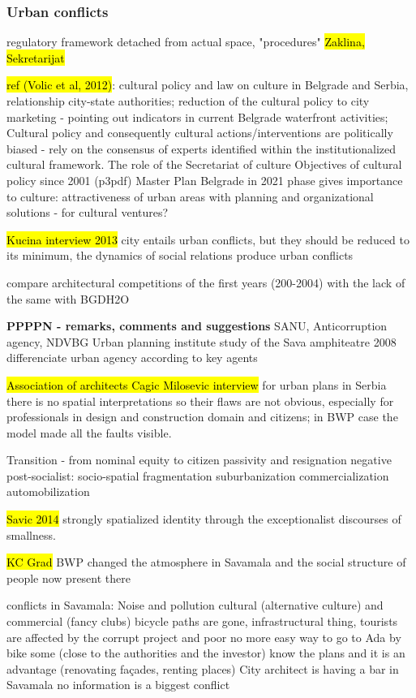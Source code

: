 \documentclass[11pt]{report}
\begin{document}
\subsubsection{Urban conflicts}

regulatory framework detached from actual space, "procedures" \hl{Zaklina, Sekretarijat}

\hl{ref (Volic et al, 2012)}:
cultural policy and law on culture in Belgrade and Serbia, relationship city-state authorities; reduction of the cultural policy to city marketing - pointing out indicators in current Belgrade waterfront activities;
Cultural policy and consequently cultural actions/interventions are  politically biased - rely on the consensus of experts identified within the institutionalized cultural framework.
The role of the Secretariat of culture
Objectives of cultural policy since 2001 (p3pdf) 
Master Plan Belgrade in 2021 phase gives importance to culture: attractiveness of urban areas with planning and organizational solutions - for cultural ventures?

\hl{Kucina interview 2013}
city entails urban conflicts, but they should be reduced to its minimum, the dynamics of social relations produce urban conflicts

compare architectural competitions of the first years (200-2004) \cite{Stupar} with the lack of the same with BGDH2O

\textbf{PPPPN - remarks, comments and suggestions}
SANU, Anticorruption agency, NDVBG
Urban planning institute study of the Sava amphiteatre 2008
differenciate urban agency according to key agents

\hl{Association of architects Cagic Milosevic interview}
for urban plans in Serbia there is no spatial interpretations so their flaws are not obvious, especially for professionals in design and construction domain and citizens; in BWP case the model made all the faults visible.

Transition - from nominal equity to citizen passivity and resignation
negative post-socialist:
socio-spatial fragmentation
suburbanization
commercialization
automobilization

\hl{Savic 2014}
strongly spatialized identity through the exceptionalist discourses of smallness.

\hl{KC Grad}
BWP changed the atmosphere in Savamala and the social structure of people now present there

conflicts in Savamala:
Noise and pollution
cultural (alternative culture) and commercial (fancy clubs)
bicycle paths are gone, infrastructural thing,
tourists are affected by the corrupt project and poor
no more easy way to go to Ada by bike
some (close to the authorities and the investor) know the plans and it is an advantage (renovating façades, renting places)
City architect is having a bar in Savamala
no information is a biggest conflict
\end{document}
